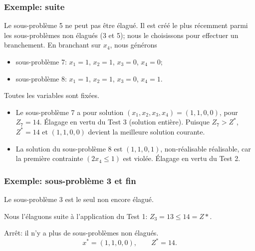 \documentclass[usepdftitle=false]{beamer}
\begin{document}
\begin{frame}
\frametitle{Exemple: suite}

Le sous-problème 5 ne peut pas être élagué.
Il est créé le plus récemment parmi les sous-problèmes non élagués (3 et 5); nous le choisissons pour effectuer un branchement.
En branchant sur $x_4$, nous générons
\begin{itemize}
\item
sous-problème 7: $x_1 = 1$, $x_2 = 1$, $x_3 = 0$, $x_4 = 0$;
\item
sous-problème 8: $x_1 = 1$, $x_2 = 1$, $x_3 = 0$, $x_4 = 1$.
\end{itemize}

\mbox{}

Toutes les variables sont fixées.
\begin{itemize}
	\item 
Le sous-problème 7 a pour solution $(x_1, x_2, x_3, x_4) = (1, 1, 0, 0)$, pour $Z_7 = 14$.
Élagage en vertu du Test 3 (solution entière).
Puisque $Z_7 > Z^*$, $Z^* = 14$ et $(1, 1, 0, 0)$ devient la meilleure solution courante.
	\item 
La solution du sous-problème 8 est $(1, 1, 0, 1)$, non-réalisable réalisable, car la première contrainte $(2x_4 \leq 1)$ est violée. Élagage en vertu du Test 2.
\end{itemize} 

\end{frame}

\begin{frame}
\frametitle{Exemple: sous-problème 3 et fin}

Le sous-problème 3 est le seul non encore élagué.

\mbox{}

Nous l'élaguons suite à l'application du Test 1: $Z_3 = 13 \leq 14 = Z*$.

\mbox{}

Arrêt: il n'y a plus de sous-problèmes non élagués.
$$
x^* = (1,1,0,0),\qquad Z^* = 14.
$$

\end{frame}
\end{document}
